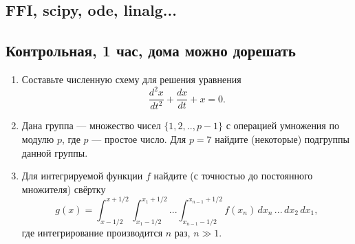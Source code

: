 \documentclass{book}
\begin{document}
\subsection{FFI, scipy, ode, linalg...}

\subsection{Контрольная, 1 час, дома можно дорешать}

\newpage

\begin{enumerate}
    \item Составьте численную схему для решения уравнения
        \begin{equation}
            \frac{d^2 x}{dt^2} + \frac{dx}{dt} + x = 0.
        \end{equation}
    \item Дана группа --- множество чисел $\{1,2,..,p - 1\}$ с операцией умножения по модулю $p$,
        где $p$ --- простое число. Для $p = 7$ найдите (некоторые) подгруппы данной группы.
    \item Для интегрируемой функции $f$ найдите (с точностью до постоянного множителя) свёртку
        \begin{equation}
            g(x) = \int_{x - 1/2}^{x + 1/2} \int_{x_1 - 1/2}^{x_1 + 1/2} ... \int_{x_{n - 1} -
            1/2}^{x_{n - 1} + 1/2}
            f(x_n) \, dx_n \,
            ... \, dx_2 \, dx_1,
        \end{equation}
        где интегрирование производится $n$ раз, $n \gg 1$.
\end{enumerate}
\end{document}
